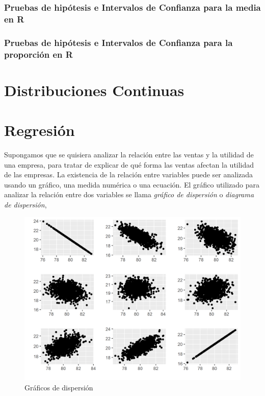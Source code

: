 \documentclass[]{book}
\begin{document}
\subsection{Pruebas de hipótesis e Intervalos de Confianza para la media
en
R}\label{pruebas-de-hipotesis-e-intervalos-de-confianza-para-la-media-en-r}

\subsection{Pruebas de hipótesis e Intervalos de Confianza para la
proporción en
R}\label{pruebas-de-hipotesis-e-intervalos-de-confianza-para-la-proporcion-en-r}

\chapter{Distribuciones Continuas}\label{distr}

\chapter{Regresión}\label{methods}

Supongamos que se quisiera analizar la relación entre las ventas y la
utilidad de una empresa, para tratar de explicar de qué forma las ventas
afectan la utilidad de las empresas. La existencia de la relación entre
variables puede ser analizada usando un gráfico, una medida numérica o
una ecuación. El gráfico utilizado para analizar la relación entre dos
variables se llama \emph{gráfico de dispersión} o \emph{diagrama de
dispersión},

\begin{figure}[h]

{\centering \includegraphics[width=0.7\linewidth]{corr} 

}

\caption{Gráficos de dispersión}\label{fig:corr}
\end{figure}
\end{document}
